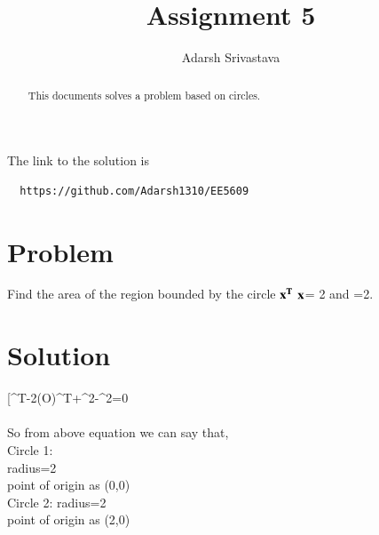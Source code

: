 \documentclass[journal,12pt,twocolumn]{IEEEtran}
\begin{document}
      \def\rightbox#1{\makebox[0in][r]{#1}}
      \def\centbox#1{\makebox[0in]{#1}}
      \def\topbox#1{\raisebox{-\baselineskip}[0in][0in]{#1}}
      \def\midbox#1{\raisebox{-0.5\baselineskip}[0in][0in]{#1}}
 \vspace{3cm}
 \title{Assignment 5}
 \author{Adarsh Srivastava}
 \maketitle
 \newpage
 \bigskip
 \renewcommand{\thetable}{\theenumi}
 The link to the solution is
 \begin{lstlisting}
  https://github.com/Adarsh1310/EE5609
 \end{lstlisting}
 \begin{abstract}
 This documents solves a problem based on circles.
 \end{abstract}
 \section{\textbf{Problem}}
Find the area of the region bounded by the circle $\bf{x}^{T}$ $\bf{x}$= 2 and =2.
 \section{\textbf{Solution}}
[^{T}-2\vec(O)^{T}+^2-^2=0\\
 
 \\
 So from above equation we can say that,\\
 Circle 1:\\
 radius=2\\
 point of origin as (0,0)\\
 Circle 2:
 radius=2\\
 point of origin as (2,0)\\
\\
 
\end{document}
